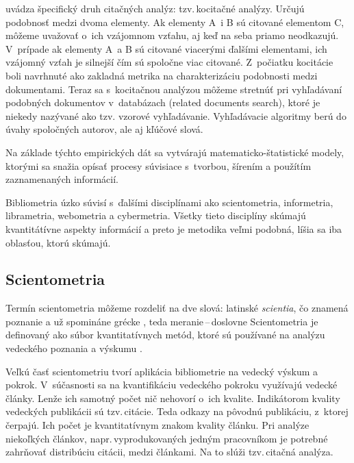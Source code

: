 \citet{Vavrikova2008} uvádza špecifický druh citačných analýz: tzv.\,kocitačné
analýzy.   Určujú podobnosť medzi dvoma elementy. Ak
elementy A~i B sú citované elementom C, môžeme uvažovať o~ich vzájomnom vzťahu,
aj keď na seba priamo neodkazujú. V~prípade ak elementy A~a B sú citované
viacerými ďalšími elementami, ich vzájomný vzťah je silnejší čím sú spoločne
viac citované. Z~počiatku kocitácie boli navrhnuté ako zakladná metrika na
charakterizáciu podobnosti medzi dokumentami. Teraz sa s~kocitačnou analýzou
môžeme stretnúť pri vyhľadávaní podobných dokumentov v~databázach (related
documents search), ktoré je niekedy nazývané ako  tzv.
vzorové vyhľadávanie. Vyhľadávacie algoritmy berú do úvahy spoločných autorov,
ale aj kľúčové slová.

Na základe týchto empirických dát sa vytvárajú matematicko-štatistické modely,
ktorými sa snažia opísať procesy súvisiace s~tvorbou, šírením a použítím
zaznamenaných informácií.

Bibliometria úzko súvisí s~ďalšími disciplínami ako scientometria, informetria,
librametria, webometria a cybermetria.  Všetky tieto disciplíny skúmajú
kvantitátívne aspekty informácií a preto je metodika veľmi podobná, líšia sa iba
oblasťou, ktorú skúmajú.


\subsection{Scientometria}

Termín scientometria môžeme rozdeliť na dve slová: latinské
\emph{scientia}, čo znamená poznanie a už
spomináne grécke , teda
meranie\,--\,doslovne  Scientometria je
definovaný ako súbor kvantitatívnych metód, ktoré sú používané na
    analýzu vedeckého poznania a výskumu \citep{Hood2001}.

Veľkú časť scientometriu tvorí aplikácia bibliometrie na vedecký výskum a
pokrok.  V~súčasnosti sa na kvantifikáciu vedeckého pokroku využívajú vedecké
články.  Lenže ich samotný počet nič nehovorí o~ich kvalite.  Indikátorom
kvality vedeckých publikácii sú tzv.\,citácie.  Teda odkazy na pôvodnú
publikáciu, z~ktorej čerpajú.  Ich počet je kvantitatívnym znakom kvality
článku.  Pri analýze niekoľkých článkov, napr.\,vyprodukovaných jedným
pracovníkom je potrebné zahrňovať distribúciu citácii, medzi článkami.  Na to
slúži tzv.\,citačná analýza.

